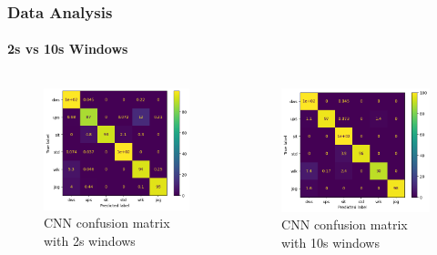 \documentclass[
	11pt, %
]{beamer}
\begin{document}
\begin{frame}

    \frametitle{Data Analysis}
    \framesubtitle{2s vs 10s Windows}

    \begin{columns}        
        \begin{figure}
            \includegraphics[width=0.9\linewidth]{cm_sliding_100.png}
            \caption{CNN confusion matrix with 2s windows}
        \end{figure}

        \begin{figure}
            \includegraphics[width=0.9\linewidth]{cm_sliding_500.png}
            \caption{CNN confusion matrix with 10s windows}
        \end{figure}
    \end{columns}
    
\end{frame}
\end{document}
